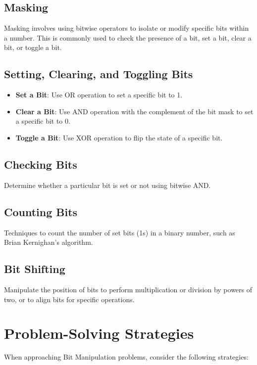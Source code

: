 \subsection*{Masking}
Masking involves using bitwise operators to isolate or modify specific bits within a number. This is commonly used to check the presence of a bit, set a bit, clear a bit, or toggle a bit.

\subsection*{Setting, Clearing, and Toggling Bits}
\begin{itemize}
    \item \textbf{Set a Bit}: Use OR operation to set a specific bit to 1.
    \item \textbf{Clear a Bit}: Use AND operation with the complement of the bit mask to set a specific bit to 0.
    \item \textbf{Toggle a Bit}: Use XOR operation to flip the state of a specific bit.
\end{itemize}

\subsection*{Checking Bits}
Determine whether a particular bit is set or not using bitwise AND.

\subsection*{Counting Bits}
Techniques to count the number of set bits (1s) in a binary number, such as Brian Kernighan’s algorithm.

\subsection*{Bit Shifting}
Manipulate the position of bits to perform multiplication or division by powers of two, or to align bits for specific operations.

\section*{Problem-Solving Strategies}

When approaching Bit Manipulation problems, consider the following strategies:

